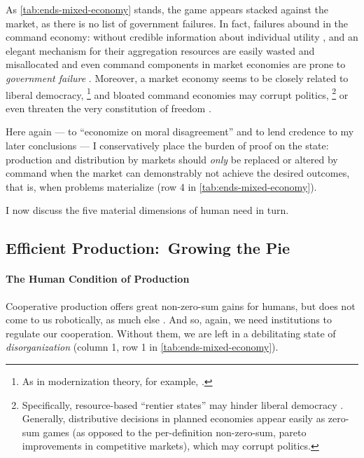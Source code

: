 As \autoref{tab:ends-mixed-economy} stands, the game appears stacked against the market, as there is no list of government failures.
In fact, failures abound in the command economy:
without credible information about individual utility \citep[confer][]{Hayek1931}, and an elegant mechanism for their aggregation  \citep[confer][]{Lerner1944, Lange1934, Debreu1954} resources are easily wasted and misallocated and even command components in market economies are prone to \emph{government failure} \citep{Coase1964}.
Moreover, a market economy seems to be closely related to liberal democracy,
\footnote{
	As in modernization theory, for example, \cite{InglehartWelzel-2005-aa}.
}
and bloated command economies may corrupt politics,
\footnote{
	Specifically, resource-based ``rentier states'' may hinder liberal democracy \citep{Beblawi1990}.
	Generally, distributive decisions in planned economies appear easily as zero-sum games (as opposed to the per-definition non-zero-sum, pareto improvements in competitive markets), which may corrupt politics.
}
or even threaten the very constitution of freedom \citep{Hayek1944, Friedman1962}.

Here again --- to ``economize on moral disagreement'' \citep[K226]{GutmannThompson-2004-aa} and to lend credence to my later conclusions --- I conservatively place the burden of proof on the state:
production and distribution by markets should \emph{only} be replaced or altered by command when the market can demonstrably not achieve the desired outcomes, that is, when problems materialize (row 4 in \autoref{tab:ends-mixed-economy}).

I now discuss the five material dimensions of human need in turn.

\subsection[Efficient Production]{Efficient Production:\ Growing the Pie}\label{sec:production}

\paragraph{The Human Condition of Production} \label{sec:human-nature-of-production}
Cooperative production offers great non-zero-sum gains for humans, but does not come to us robotically, as much else \citep{Wilson2012}.
And so, again, we need institutions to regulate our cooperation.
Without them, we are left in a debilitating state of \emph{disorganization} (column 1, row 1 in \autoref{tab:ends-mixed-economy}).


